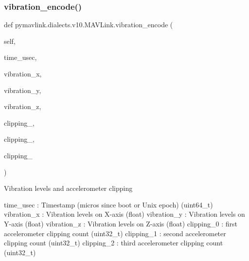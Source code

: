 \begin{DoxyVerb}
\begin{DoxyVerb}
\begin{DoxyVerb}
\begin{DoxyVerb}
\begin{DoxyVerb}
\begin{DoxyVerb}
\begin{DoxyVerb}
\begin{DoxyVerb}
\begin{DoxyVerb}
\begin{DoxyVerb}
\subsubsection{\texorpdfstring{vibration\+\_\+encode()}{vibration\_encode()}}
{\footnotesize\ttfamily def pymavlink.\+dialects.\+v10.\+M\+A\+V\+Link.\+vibration\+\_\+encode (\begin{DoxyParamCaption}\item[{}]{self,  }\item[{}]{time\+\_\+usec,  }\item[{}]{vibration\+\_\+x,  }\item[{}]{vibration\+\_\+y,  }\item[{}]{vibration\+\_\+z,  }\item[{}]{clipping\+\_,  }\item[{}]{clipping\+\_,  }\item[{}]{clipping\+\_ }\end{DoxyParamCaption})}

\begin{DoxyVerb}Vibration levels and accelerometer clipping

time_usec                 : Timestamp (micros since boot or Unix epoch) (uint64_t)
vibration_x               : Vibration levels on X-axis (float)
vibration_y               : Vibration levels on Y-axis (float)
vibration_z               : Vibration levels on Z-axis (float)
clipping_0                : first accelerometer clipping count (uint32_t)
clipping_1                : second accelerometer clipping count (uint32_t)
clipping_2                : third accelerometer clipping count (uint32_t)\end{DoxyVerb}
 \mbox{\label{classpymavlink_1_1dialects_1_1v10_1_1MAVLink_a85527943a237f509e36e26a2cb228ab0}} 

\end{DoxyVerb}
\end{DoxyVerb}
\end{DoxyVerb}
\end{DoxyVerb}
\end{DoxyVerb}
\end{DoxyVerb}
\end{DoxyVerb}
\end{DoxyVerb}
\end{DoxyVerb}
\end{DoxyVerb}
